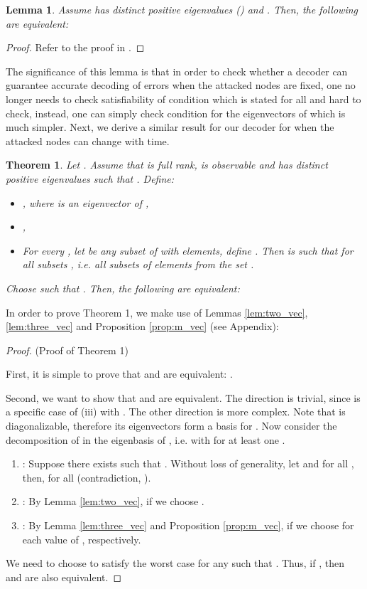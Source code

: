 \documentclass[journal]{IEEEtran}
\newtheorem{lem}{\bf{Lemma}}
\newtheorem{thm}{\bf{Theorem}}
\begin{document}
\begin{lem} \label{lem:distinct}
Assume  has  distinct positive eigenvalues () and . Then, the following are equivalent:

\end{lem}
\begin{proof} Refer to the proof in \cite{Fawzi2014}.
\end{proof}
\noindent
The significance of this lemma is that in order to check whether a decoder can guarantee accurate decoding of  errors when the attacked nodes are fixed, one no longer needs to check satisfiability of condition  which is stated for all  and hard to check, instead, one can simply check condition  for the eigenvectors of  which is much simpler. Next, we derive a similar result for our decoder for when the attacked nodes can change with time.

\begin{thm} Let . Assume that  is full rank,  is observable and  has  distinct positive eigenvalues such that . Define:
\begin{itemize}
\item
, where  is an eigenvector of , \item
,
\item
For every , let  be any subset of  with  elements, define .
Then  is such that  for all subsets , i.e. all subsets of  elements from the set .
\end{itemize}
Choose  such that  .
Then, the following are equivalent:

\end{thm}
\noindent
In order to prove Theorem 1, we make use of Lemmas \ref{lem:two_vec}, \ref{lem:three_vec} and Proposition \ref{prop:m_vec} (see Appendix): 

\begin{proof} (Proof of Theorem 1)

First, it is simple to prove that  and  are equivalent: . 

Second, we want to show that  and  are equivalent. The direction  is trivial, since  is a specific case of (iii) with . The other direction is more complex. Note that  is diagonalizable, therefore its eigenvectors form a basis for . Now consider the decomposition of  in the eigenbasis of , i.e.  with  for at least one . 
\begin{enumerate}
\item : Suppose there exists  such that . Without loss of generality, let  and  for all , then,  for all  (contradiction, ). 
\item : By Lemma \ref{lem:two_vec}, if we choose .
\item : By Lemma \ref{lem:three_vec} and Proposition \ref{prop:m_vec}, if we choose  for each value of , respectively.
\end{enumerate}
We need to choose  to satisfy the worst case for any  such that . Thus, if , then  and  are also equivalent.
\end{proof}
\end{document}
